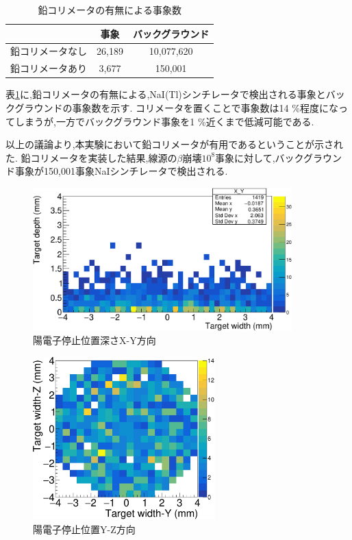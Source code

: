 \begin{table}[htbp]
	\centering
	\caption{鉛コリメータの有無による事象数}
		\label{table_test2}	
	  \begin{tabular}{ccc} 
		\hline
		   				&事象& バックグラウンド \\ 
		\hline \hline
		鉛コリメータなし & 26,189 & 10,077,620 \\
		鉛コリメータあり & 3,677  & 150,001   \\
		\hline
	  \end{tabular}
\end{table}

表\ref{table_test2}に,鉛コリメータの有無による,NaI(Tl)シンチレータで検出される事象とバックグラウンドの事象数を示す.
コリメータを置くことで事象数は14 \%程度になってしまうが,一方でバックグラウンド事象を1 \%近くまで低減可能である.

以上の議論より,本実験において鉛コリメータが有用であるということが示された.
鉛コリメータを実装した結果,線源の$\beta$崩壊$10^8$事象に対して,バックグラウンド事象が150,001事象NaIシンチレータで検出される.

\begin{figure}[htbp]
	\centering
		\includegraphics[width=10cm]{fig/test2bXY.pdf}
	\caption{陽電子停止位置深さX-Y方向}
	\label{test2bXY}
\end{figure}

\begin{figure}[htbp]
	\centering
		\includegraphics[width=7cm]{fig/test2bYZ.pdf}
	\caption{陽電子停止位置Y-Z方向}
	\label{test2bYZ}
\end{figure}




